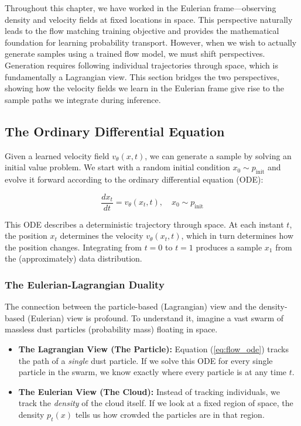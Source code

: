 \documentclass{book}
\begin{document}
Throughout this chapter, we have worked in the Eulerian frame—observing density and velocity fields at fixed locations in space. This perspective naturally leads to the flow matching training objective and provides the mathematical foundation for learning probability transport. However, when we wish to actually generate samples using a trained flow model, we must shift perspectives. Generation requires following individual trajectories through space, which is fundamentally a Lagrangian view. This section bridges the two perspectives, showing how the velocity fields we learn in the Eulerian frame give rise to the sample paths we integrate during inference.

\subsection{The Ordinary Differential Equation}

Given a learned velocity field $v_\theta(x, t)$, we can generate a sample by solving an initial value problem. We start with a random initial condition $x_0 \sim p_{\text{init}}$ and evolve it forward according to the ordinary differential equation (ODE):

\begin{equation} \label{eq:flow_ode}
\frac{dx_t}{dt} = v_\theta(x_t, t), \quad x_0 \sim p_{\text{init}}
\end{equation}

This ODE describes a deterministic trajectory through space. At each instant $t$, the position $x_t$ determines the velocity $v_\theta(x_t, t)$, which in turn determines how the position changes. Integrating from $t = 0$ to $t = 1$ produces a sample $x_1$ from the (approximately) data distribution.

\subsubsection{The Eulerian-Lagrangian Duality}

The connection between the particle-based (Lagrangian) view and the density-based (Eulerian) view is profound. To understand it, imagine a vast swarm of massless dust particles (probability mass) floating in space.

\begin{itemize}
    \item \textbf{The Lagrangian View (The Particle):}
    Equation (\ref{eq:flow_ode}) tracks the path of a \textit{single} dust particle. If we solve this ODE for every single particle in the swarm, we know exactly where every particle is at any time $t$.

    \item \textbf{The Eulerian View (The Cloud):}
    Instead of tracking individuals, we track the \textit{density} of the cloud itself. If we look at a fixed region of space, the density $p_t(x)$ tells us how crowded the particles are in that region.
\end{itemize}
\end{document}
